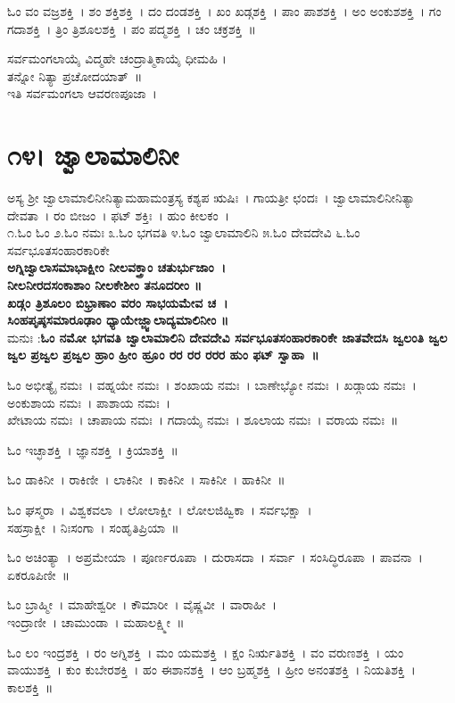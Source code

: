 ಓಂ ವಂ ವಜ್ರಶಕ್ತಿ~।  ಶಂ ಶಕ್ತಿಶಕ್ತಿ~।  ದಂ ದಂಡಶಕ್ತಿ~।  ಖಂ ಖಡ್ಗಶಕ್ತಿ~।  ಪಾಂ ಪಾಶಶಕ್ತಿ~।  ಅಂ ಅಂಕುಶಶಕ್ತಿ~।  ಗಂ ಗದಾಶಕ್ತಿ~।  ತ್ರಿಂ ತ್ರಿಶೂಲಶಕ್ತಿ~।  ಪಂ ಪದ್ಮಶಕ್ತಿ~।  ಚಂ ಚಕ್ರಶಕ್ತಿ~॥

ಸರ್ವಮಂಗಲಾಯೈ ವಿದ್ಮಹೇ ಚಂದ್ರಾತ್ಮಿಕಾಯೈ ಧೀಮಹಿ ।\\ತನ್ನೋ ನಿತ್ಯಾ ಪ್ರಚೋದಯಾತ್~॥\\
ಇತಿ ಸರ್ವಮಂಗಲಾ ಆವರಣಪೂಜಾ~।
\section{೧೪। ಜ್ವಾಲಾಮಾಲಿನೀ}
ಅಸ್ಯ ಶ್ರೀ ಜ್ವಾಲಾಮಾಲಿನೀನಿತ್ಯಾಮಹಾಮಂತ್ರಸ್ಯ ಕಶ್ಯಪ ಋಷಿಃ~। ಗಾಯತ್ರೀ ಛಂದಃ~। ಜ್ವಾಲಾಮಾಲಿನೀನಿತ್ಯಾ ದೇವತಾ~। ರಂ ಬೀಜಂ~। ಫಟ್ ಶಕ್ತಿಃ~। ಹುಂ ಕೀಲಕಂ~।\\
೧.ಓಂ ಓಂ ೨.ಓಂ ನಮಃ ೩.ಓಂ ಭಗವತಿ ೪.ಓಂ ಜ್ವಾಲಾಮಾಲಿನಿ ೫.ಓಂ ದೇವದೇವಿ ೬.ಓಂ ಸರ್ವಭೂತಸಂಹಾರಕಾರಿಕೇ \\
{\bfseries ಅಗ್ನಿಜ್ವಾಲಾಸಮಾಭಾಕ್ಷೀಂ ನೀಲವಕ್ತ್ರಾಂ ಚತುರ್ಭುಜಾಂ~।\\ನೀಲನೀರದಸಂಕಾಶಾಂ ನೀಲಕೇಶೀಂ ತನೂದರೀಂ ॥\\
ಖಡ್ಗಂ ತ್ರಿಶೂಲಂ ಬಿಭ್ರಾಣಾಂ ವರಂ ಸಾಭಯಮೇವ ಚ~।\\ಸಿಂಹಪೃಷ್ಠಸಮಾರೂಢಾಂ ಧ್ಯಾಯೇಜ್ಜ್ವಾಲಾದ್ಯಮಾಲಿನೀಂ ॥\\}
ಮನುಃ :{\bfseries  ಓಂ ನಮೋ ಭಗವತಿ ಜ್ವಾಲಾಮಾಲಿನಿ ದೇವದೇವಿ ಸರ್ವಭೂತಸಂಹಾರಕಾರಿಕೇ ಜಾತವೇದಸಿ ಜ್ವಲಂತಿ ಜ್ವಲ ಜ್ವಲ ಪ್ರಜ್ವಲ ಪ್ರಜ್ವಲ ಹ್ರಾಂ ಹ್ರೀಂ ಹ್ರೂಂ ರರ ರರ ರರರ ಹುಂ ಫಟ್ ಸ್ವಾಹಾ~॥}

ಓಂ ಅಭೀತ್ಯೈ ನಮಃ~।  ವಹ್ನಯೇ ನಮಃ~।  ಶಂಖಾಯ ನಮಃ~।  ಬಾಣೇಭ್ಯೋ ನಮಃ~।  ಖಡ್ಗಾಯ ನಮಃ~।  ಅಂಕುಶಾಯ ನಮಃ~।  ಪಾಶಾಯ ನಮಃ~। \\ಖೇಟಾಯ ನಮಃ~।  ಚಾಪಾಯ ನಮಃ~।  ಗದಾಯೈ ನಮಃ~।  ಶೂಲಾಯ ನಮಃ~।  ವರಾಯ ನಮಃ~॥

ಓಂ ಇಚ್ಛಾಶಕ್ತಿ~।  ಜ್ಞಾನಶಕ್ತಿ~।  ಕ್ರಿಯಾಶಕ್ತಿ~॥ 

ಓಂ ಡಾಕಿನೀ~।  ರಾಕಿಣೀ~।  ಲಾಕಿನೀ~।  ಕಾಕಿನೀ~।  ಸಾಕಿನೀ~।  ಹಾಕಿನೀ~॥ 

ಓಂ ಘಸ್ಮರಾ~।  ವಿಶ್ವಕವಲಾ~।  ಲೋಲಾಕ್ಷೀ~।  ಲೋಲಜಿಹ್ವಿಕಾ~।  ಸರ್ವಭಕ್ಷಾ~। \\ ಸಹಸ್ರಾಕ್ಷೀ~।  ನಿಃಸಂಗಾ~।  ಸಂಹೃತಿಪ್ರಿಯಾ~॥ 

ಓಂ ಅಚಿಂತ್ಯಾ~।  ಅಪ್ರಮೇಯಾ~।  ಪೂರ್ಣರೂಪಾ~।  ದುರಾಸದಾ~।  ಸರ್ವಾ~।  ಸಂಸಿದ್ಧಿರೂಪಾ~।  ಪಾವನಾ~।  ಏಕರೂಪಿಣೀ~॥ 

ಓಂ ಬ್ರಾಹ್ಮೀ~।  ಮಾಹೇಶ್ವರೀ~।  ಕೌಮಾರೀ~।  ವೈಷ್ಣವೀ~।  ವಾರಾಹೀ~।\\ ಇಂದ್ರಾಣೀ~।  ಚಾಮುಂಡಾ~।  ಮಹಾಲಕ್ಷ್ಮೀ~॥ 

ಓಂ ಲಂ ಇಂದ್ರಶಕ್ತಿ~।  ರಂ ಅಗ್ನಿಶಕ್ತಿ~।  ಮಂ ಯಮಶಕ್ತಿ~।  ಕ್ಷಂ ನಿರ್ಋತಿಶಕ್ತಿ~।  ವಂ ವರುಣಶಕ್ತಿ~।  ಯಂ ವಾಯುಶಕ್ತಿ~।  ಕುಂ ಕುಬೇರಶಕ್ತಿ~।  ಹಂ ಈಶಾನಶಕ್ತಿ~।  ಆಂ ಬ್ರಹ್ಮಶಕ್ತಿ~।  ಹ್ರೀಂ ಅನಂತಶಕ್ತಿ~।  ನಿಯತಿಶಕ್ತಿ~।  ಕಾಲಶಕ್ತಿ~॥

